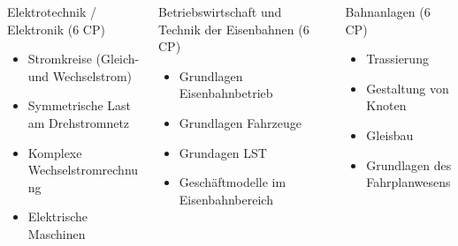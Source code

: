 \documentclass[slidestop,compress,mathserif, aspectratio = 169, 9pt]{beamer}
\begin{document}
{ \begin{columns}[t] 
     \begin{column}[T]{4.5cm} 
     Elektrotechnik / Elektronik (6 CP)
     	\begin{itemize}
     	\item Stromkreise (Gleich- und Wechselstrom) 
	\item Symmetrische Last am Drehstromnetz 
	\item Komplexe Wechselstromrechnung
	\item Elektrische Maschinen
     	\end{itemize}
     \end{column}
     	\begin{column}[T]{4.5cm} 
	Betriebswirtschaft und Technik der Eisenbahnen (6 CP)
     	\begin{itemize}
     	\item Grundlagen Eisenbahnbetrieb
	\item Grundlagen Fahrzeuge
	\item Grundagen LST
	\item Gesch\"aftmodelle im Eisenbahnbereich
     	\end{itemize}
     \end{column}
     \begin{column}[T]{4.5cm} 
     Bahnanlagen (6 CP)
     	\begin{itemize}
     	\item Trassierung
     	\item Gestaltung von Knoten
     	\item Gleisbau
     	\item Grundlagen des Fahrplanwesens
     	\end{itemize}
     \end{column}
 \end{columns}

}

\end{document}
